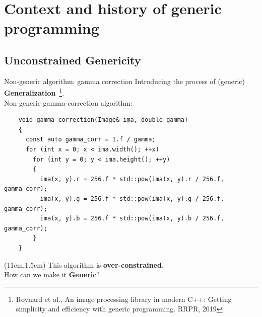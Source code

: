 \documentclass[12pt,aspectratio=169]{beamer}
\begin{document}
%
%
%


\section[Context and history of generic programming]{Context and history of generic programming}

\subsection[Unconstrained Genericity]{Unconstrained Genericity}

\begin{frame}[fragile]{Non-generic algorithm: gamma correction}
  Introducing the process of (generic) \textbf{Generalization}~\footnote{Roynard et al., An image processing library in
    modern C++: Getting simplicity and efficiency with generic programming. RRPR, 2019}. \\
  Non-generic gamma-correction algorithm:
  \vspace{-0.3cm}
  \begin{verbatim}
    void gamma_correction(Image& ima, double gamma)
    {
      const auto gamma_corr = 1.f / gamma;
      for (int x = 0; x < ima.width(); ++x)
        for (int y = 0; y < ima.height(); ++y)
        {
          ima(x, y).r = 256.f * std::pow(ima(x, y).r / 256.f, gamma_corr);
          ima(x, y).g = 256.f * std::pow(ima(x, y).g / 256.f, gamma_corr);
          ima(x, y).b = 256.f * std::pow(ima(x, y).b / 256.f, gamma_corr);
        }
    }
  \end{verbatim}
  \begin{textblock*}{4cm}(11cm,1.5cm)
    This algorithm is \textbf{over-constrained}. \\
    How can we make it \textbf{Generic}?
  \end{textblock*}
\end{frame}

\end{document}
